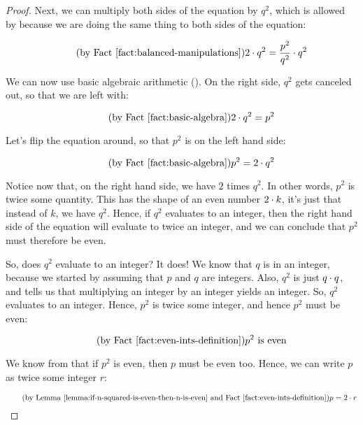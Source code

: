 \documentclass[../../../main.tex]{subfiles}
\begin{document}
\begin{proof}
Next, we can multiply both sides of the equation by $q^{2}$, which is allowed by  because we are doing the same thing to both sides of the equation:

\begin{equation*}
  \tag{by \factref{fact:balanced-manipulations}}
  2 \mult/ q^{2} = \frac{p^{2}}{q^{2}} \mult/ q^{2}
\end{equation*}

We can now use basic algebraic arithmetic (). On the right side, $q^{2}$ gets canceled out, so that we are left with:

\begin{equation*}
  \tag{by \factref{fact:basic-algebra}}
  2 \mult/ q^{2} = p^{2}
\end{equation*}

Let's flip the equation around, so that $p^{2}$ is on the left hand side:

\begin{equation*}
  \tag{by \factref{fact:basic-algebra}}
  p^{2} = 2 \mult/ q^{2}
\end{equation*}

Notice now that, on the right hand side, we have $2$ times $q^{2}$. In other words, $p^{2}$ is twice some quantity. This has the shape of an even number $2 \mult/ k$, it's just that instead of $k$, we have $q^{2}$. Hence, if $q^{2}$ evaluates to an integer, then the right hand side of the equation will evaluate to twice an integer, and we can conclude that $p^{2}$ must therefore be even.

So, does $q^{2}$ evaluate to an integer? It does! We know that $q$ is in an integer, because we started by assuming that $p$ and $q$ are integers. Also, $q^{2}$ is just $q \mult/ q$, and  tells us that multiplying an integer by an integer yields an integer. So, $q^{2}$ evaluates to an integer. Hence, $p^{2}$ is twice some integer, and hence $p^{2}$ must be even:

\begin{equation*}
  \tag{by \factref{fact:even-ints-definition}}
  p^{2} \text{ is even}
\end{equation*}

We know from  that if $p^{2}$ is even, then $p$ must be even too. Hence, we can write $p$ as twice some integer $r$:

\begin{equation*}
  \tag{by \lemmaref{lemma:if-n-squared-is-even-then-n-is-even} and \factref{fact:even-ints-definition}}
  p = 2 \mult/ r
\end{equation*}


\end{proof}
\end{document}
